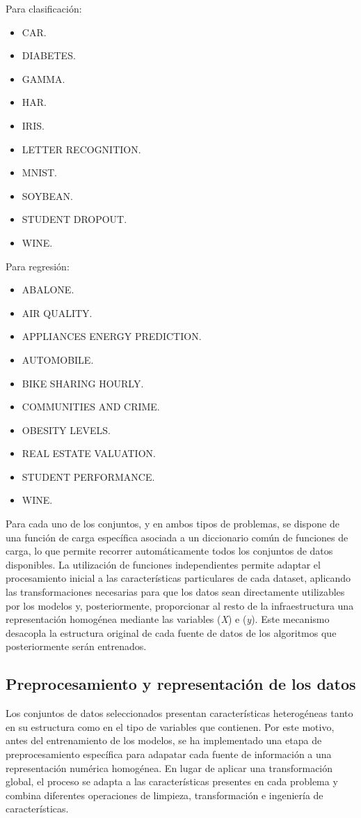 \documentclass[a4paper,12pt,twoside,final]{book}
\begin{document}
Para clasificación:
\begin{itemize}
  \item CAR.
  \item DIABETES.
  \item GAMMA.
  \item HAR.
  \item IRIS.
  \item LETTER RECOGNITION.
  \item MNIST.
  \item SOYBEAN.
  \item STUDENT DROPOUT.
  \item WINE.
\end{itemize}

Para regresión:
\begin{itemize}
  \item ABALONE.
  \item AIR QUALITY.
  \item APPLIANCES ENERGY PREDICTION.
  \item AUTOMOBILE.
  \item BIKE SHARING HOURLY.
  \item COMMUNITIES AND CRIME.
  \item OBESITY LEVELS.
  \item REAL ESTATE VALUATION.
  \item STUDENT PERFORMANCE.
  \item WINE.
\end{itemize}

Para cada uno de los conjuntos, y en ambos tipos de problemas, se dispone de una función de carga específica
asociada a un diccionario común de funciones de carga, lo que permite recorrer automáticamente todos los conjuntos
de datos disponibles. La utilización de funciones independientes permite adaptar el procesamiento inicial a las
características particulares de cada dataset, aplicando las transformaciones necesarias para que los datos sean
directamente utilizables por los modelos y, posteriormente, proporcionar al resto de la infraestructura una
representación homogénea mediante las variables (\textit{X}) e (\textit{y}). Este mecanismo desacopla la estructura
original de cada fuente de datos de los algoritmos que posteriormente serán entrenados.

\subsection{Preprocesamiento y representación de los datos}
Los conjuntos de datos seleccionados presentan características heterogéneas tanto en su estructura como en el tipo
de variables que contienen. Por este motivo, antes del entrenamiento de los modelos, se ha implementado una etapa de
preprocesamiento específica para adapatar cada fuente de información a una representación numérica homogénea. En
lugar de aplicar una transformación global, el proceso se adapta a las características presentes en cada problema y
combina diferentes operaciones de limpieza, transformación e ingeniería de características.\\
\end{document}
